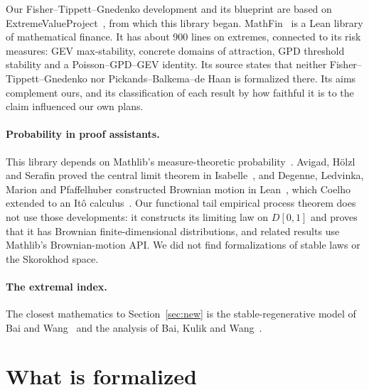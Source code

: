 \documentclass[11pt]{article}
\begin{document}
Our Fisher--Tippett--Gnedenko development and its blueprint are based on ExtremeValueProject~\cite{evp}, from which this library began. MathFin~\cite{coelho}
is a Lean library of mathematical finance. It has about 900 lines on extremes, connected to its risk measures: GEV max-stability, concrete domains of attraction, GPD threshold stability and a Poisson--GPD--GEV identity. Its source states that neither Fisher--Tippett--Gnedenko nor Pickands--Balkema--de Haan
is formalized there. Its aims complement ours, and its classification of each result by how faithful it is to the claim influenced our own plans.

\paragraph{Probability in proof assistants.} This library depends on Mathlib's measure-theoretic probability~\cite{mathlib,doob}. Avigad, H\"olzl and Serafin proved the central limit theorem in Isabelle~\cite{clt}, and
Degenne, Ledvinka, Marion and Pfaffelhuber constructed Brownian motion in Lean~\cite{brownian}, which Coelho extended to an It\^o calculus~\cite{ito}. Our functional tail empirical process theorem does not use those developments: it constructs its limiting law on $D[0,1]$ and proves that it has Brownian finite-dimensional distributions, and related results use Mathlib's Brownian-motion API.
We did not find formalizations of stable laws or the Skorokhod space.

\paragraph{The extremal index.} The closest mathematics to Section~\ref{sec:new} is the stable-regenerative model of Bai and Wang~\cite{bw} and the analysis of Bai, Kulik and Wang~\cite{bkw}.

\section{What is formalized}\label{sec:contents}
\end{document}
